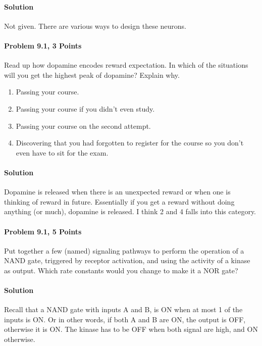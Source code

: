 \documentclass[a4paper,10pt]{article}
\begin{document}
\paragraph{Solution} Not given. There are various ways to design these neurons.

\paragraph{Problem 9.1, 3 Points}

Read up how dopamine encodes reward expectation. In which of the situations will
you get the highest peak of dopamine? Explain why.

\begin{enumerate}
    \item Passing your course.
    \item Passing your course if you didn’t even study.
    \item Passing your course on the second attempt.
    \item Discovering that you had forgotten to register for the course so you don’t
even have to sit for the exam.

\end{enumerate}

\paragraph{Solution} Dopamine is released when there is an unexpected reward or
when one is thinking of reward in future. Essentially if you get a reward
without doing anything (or much), dopamine is released. I think 2 and 4 falls
into this category.

\paragraph{Problem 9.1, 5 Points}
Put together a few (named) signaling pathways to perform the operation of a NAND
gate, triggered by receptor activation, and using the activity of a kinase as
output. Which rate constants would you change to make it a NOR gate?

\paragraph{Solution} Recall that a NAND gate with inputs A and B, is ON when at
most 1 of the inputs is ON. Or in other words, if both A and B are ON, the
output is OFF, otherwise it is ON. The kinase has to be OFF when both signal are
high, and ON otherwise.
\end{document}
